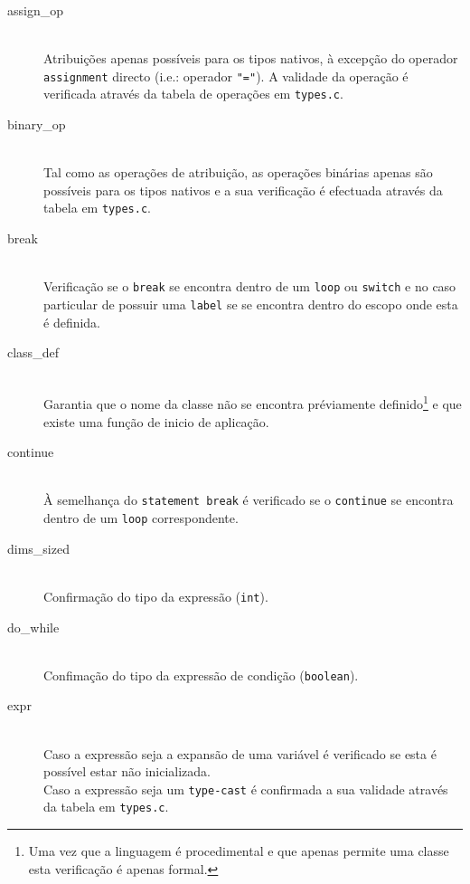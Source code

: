 \documentclass[a4paper]{article}
\begin{document}
\begin{description}
	\item [assign\_op] \hfill \\
		Atribuições apenas possíveis para os tipos nativos, à excepção do operador \texttt{assignment} directo (i.e.: operador \texttt{"="}).
		A validade da operação é verificada através da tabela de operações em \texttt{types.c}.

	\item [binary\_op] \hfill \\
		Tal como as operações de atribuição, as operações binárias apenas são possíveis para os tipos nativos e a sua verificação
		é efectuada através da tabela em \texttt{types.c}.

	\item [break] \hfill \\
		Verificação se o \texttt{break} se encontra dentro de um \texttt{loop} ou \texttt{switch}
		e no caso particular de possuir uma \texttt{label} se se encontra dentro do escopo onde esta é definida.

	\item [class\_def] \hfill \\
		Garantia que o nome da classe não se encontra préviamente definido\footnote[1]{Uma vez que a linguagem é procedimental e que apenas permite uma classe esta verificação é apenas formal.} e que existe uma função
		de inicio de aplicação.

	\item [continue] \hfill \\
		À semelhança do \texttt{statement break} é verificado se o \texttt{continue} se encontra dentro de um \texttt{loop} correspondente.

	\item [dims\_sized] \hfill \\
		Confirmação do tipo da expressão (\texttt{int}).

	\item [do\_while] \hfill \\
		Confimação do tipo da expressão de condição (\texttt{boolean}).

	\item [expr] \hfill \\
		Caso a expressão seja a expansão de uma variável é verificado se esta é possível estar não inicializada. \\
		Caso a expressão seja um \texttt{type-cast} é confirmada a sua validade através da tabela em \texttt{types.c}.


\end{description}
\end{document}
